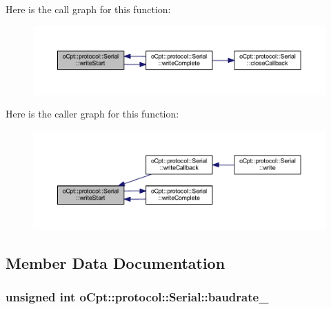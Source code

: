 Here is the call graph for this function\+:
\nopagebreak
\begin{figure}[H]
\begin{center}
\leavevmode
\includegraphics[width=350pt]{classo_cpt_1_1protocol_1_1_serial_a1fedc27e16c383de81e5a05fee742581_cgraph}
\end{center}
\end{figure}




Here is the caller graph for this function\+:
\nopagebreak
\begin{figure}[H]
\begin{center}
\leavevmode
\includegraphics[width=350pt]{classo_cpt_1_1protocol_1_1_serial_a1fedc27e16c383de81e5a05fee742581_icgraph}
\end{center}
\end{figure}




\subsection{Member Data Documentation}
\subsubsection[{\texorpdfstring{baudrate\+\_\+}{baudrate_}}]{\setlength{\rightskip}{0pt plus 5cm}unsigned int o\+Cpt\+::protocol\+::\+Serial\+::baudrate\+\_\+\hspace{0.3cm}{\ttfamily [protected]}}\hypertarget{classo_cpt_1_1protocol_1_1_serial_ad24eda3d37c870d3f83af0a67d63d2ae}{}\label{classo_cpt_1_1protocol_1_1_serial_ad24eda3d37c870d3f83af0a67d63d2ae}
